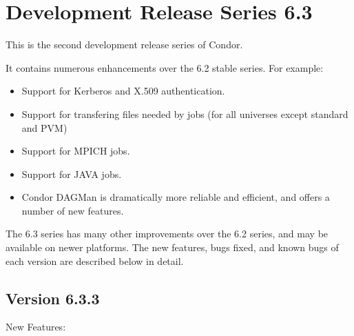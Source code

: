 \section{\label{sec:History-6-3}Development Release Series 6.3}

This is the second development release series of Condor.

It contains numerous enhancements over the 6.2 stable series.
For example:

\begin{itemize}

\item Support for Kerberos and X.509 authentication.

\item Support for transfering files needed by jobs (for all universes
except standard and PVM)

\item Support for MPICH jobs.

\item Support for JAVA jobs.

\item 
Condor DAGMan is dramatically more reliable and efficient, and offers
a number of new features.

\end{itemize}

The 6.3 series has many other improvements over the 6.2 series, and
may be available on newer platforms.  The new features, bugs fixed,
and known bugs of each version are described below in detail.


\subsection{\label{sec:New-6-3-3}Version 6.3.3}

\noindent New Features:

